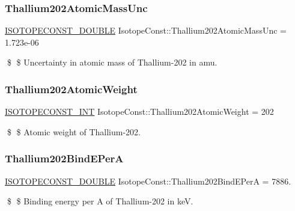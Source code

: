 \subsubsection{\texorpdfstring{Thallium202\+Atomic\+Mass\+Unc}{Thallium202AtomicMassUnc}}
{\footnotesize\ttfamily \mbox{\hyperlink{group___isotope_const-_macros_ga8f45a7272ce02c0b4c65c44636ed719a}{I\+S\+O\+T\+O\+P\+E\+C\+O\+N\+S\+T\+\_\+\+D\+O\+U\+B\+LE}} Isotope\+Const\+::\+Thallium202\+Atomic\+Mass\+Unc = 1.\+723e-\/06}

\$ \$ Uncertainty in atomic mass of Thallium-\/202 in amu. \mbox{\label{group___isotope_const-_thallium-_tl202_gae0554d9c18c1d2199c994da02e0a274f}} 
\subsubsection{\texorpdfstring{Thallium202\+Atomic\+Weight}{Thallium202AtomicWeight}}
{\footnotesize\ttfamily \mbox{\hyperlink{group___isotope_const-_macros_ga5f18360b3e99483a35c32d789e62621c}{I\+S\+O\+T\+O\+P\+E\+C\+O\+N\+S\+T\+\_\+\+I\+NT}} Isotope\+Const\+::\+Thallium202\+Atomic\+Weight = 202}

\$ \$ Atomic weight of Thallium-\/202. \mbox{\label{group___isotope_const-_thallium-_tl202_ga264442442c1b8728f7c60377ebbb92e5}} 
\subsubsection{\texorpdfstring{Thallium202\+Bind\+E\+PerA}{Thallium202BindEPerA}}
{\footnotesize\ttfamily \mbox{\hyperlink{group___isotope_const-_macros_ga8f45a7272ce02c0b4c65c44636ed719a}{I\+S\+O\+T\+O\+P\+E\+C\+O\+N\+S\+T\+\_\+\+D\+O\+U\+B\+LE}} Isotope\+Const\+::\+Thallium202\+Bind\+E\+PerA = 7886.}

\$ \$ Binding energy per A of Thallium-\/202 in keV. \mbox{\label{group___isotope_const-_thallium-_tl202_ga4db8668f37e56d1ed503d7559aabfc0a}} 
